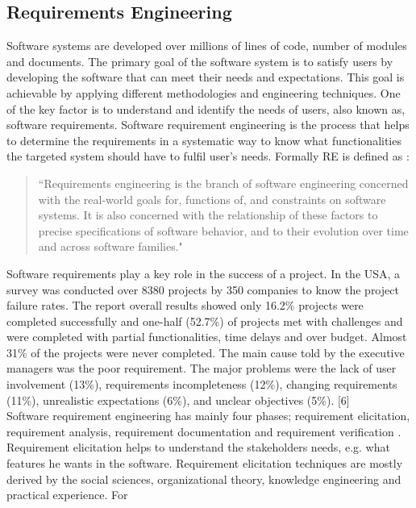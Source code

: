 \subsection{Requirements Engineering}

Software systems are developed over millions of lines of code, number of modules
and documents. The primary goal of the software system is to satisfy users by
developing the software that can meet their needs and expectations. This goal is
achievable by applying different methodologies and engineering techniques. One
of the key factor is to understand and identify the needs of users, also known
as, software requirements. Software requirement engineering is the process that
helps to determine the requirements in a systematic way to know what
functionalities the targeted system should have to fulfil user's needs. Formally
RE is defined as \cite{Zave:1997:CRE:267580.267581}:\\
\begin{quote}
``Requirements engineering is the branch of software engineering concerned with the real-world
goals for, functions of, and constraints on software systems. It is also concerned with the
relationship of these factors to precise specifications of software behavior, and to their evolution
over time and across software families."
\end{quote}
Software requirements play a key role in the success of a project. In the USA, a
survey was conducted over 8380 projects by 350 companies to know the project
failure rates. The report overall results showed only 16.2\% projects were
completed successfully and one-half (52.7\%) of projects met with challenges and
were completed with partial functionalities, time delays and over budget. Almost
31\% of the projects were never completed. The main cause told by the executive
managers was the poor requirement. The major problems were the lack of user
involvement (13\%), requirements incompleteness (12\%), changing requirements
(11\%), unrealistic expectations (6\%), and unclear objectives
(5\%).\cite{knuthwebsite} [6]\\
Software requirement engineering has mainly four phases; requirement
elicitation, requirement analysis, requirement documentation and requirement
verification \cite {Kotonya:1998:REP:552009}. Requirement elicitation
\cite{Coughlan:2002:ECR:2740304.2740444,Zowghi2005} helps to understand the
stakeholders needs, e.g. what features he wants in the software.
Requirement elicitation techniques are mostly derived by the social sciences,
organizational theory, knowledge engineering and practical experience. For

